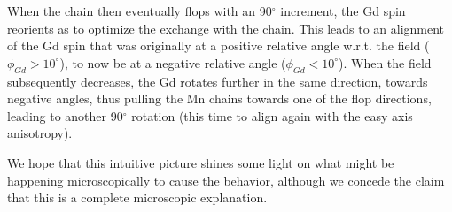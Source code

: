 When the chain then eventually flops with an 90$^\circ$ increment, the Gd spin reorients as to optimize the exchange with the chain.
This leads to an alignment of the Gd spin that was originally at a positive relative angle w.r.t. the field ($\phi_{Gd}>10^\circ$), to now be at a negative relative angle ($\phi_{Gd}<10^\circ$).
When the field subsequently decreases, the Gd rotates further in the same direction, towards negative angles, thus pulling the Mn chains towards one of the flop directions, leading to another 90$^\circ$ rotation (this time to align again with the easy axis anisotropy).

%
We hope that this intuitive picture shines some light on what might be happening microscopically to cause the behavior, although we concede the claim that this is a complete microscopic explanation.

